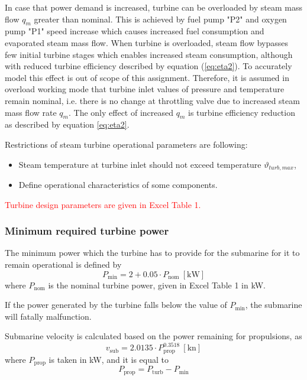\documentclass[openany]{book}
\begin{document}
	In case that power demand is increased, turbine can be overloaded by steam 
	mass flow $q_m$ greater than nominal. This is achieved by fuel pump "P2" 
	and oxygen pump "P1" speed increase which causes increased fuel consumption 
	and evaporated steam mass flow. When turbine is overloaded, steam flow 
	bypasses few initial turbine stages which enables increased steam 
	consumption, although with reduced turbine efficiency described by equation 
	(\ref{eq:eta2}). To accurately model this effect is out of scope of this assignment. 
	Therefore, it is assumed in overload working mode that turbine inlet values 
	of pressure and temperature remain nominal, i.e. there is no change at 
	throttling valve due to increased steam mass flow rate $q_m$. The only 
	effect of increased $q_m$ is turbine efficiency reduction as described by 
	equation \ref{eq:eta2}.
	
	Restrictions of steam turbine operational parameters are following:
	
	\begin{itemize}
		\item Steam temperature at turbine inlet should not exceed temperature 
		$\vartheta_{turb,max}$,
		\item Define operational characteristics of some components.
	\end{itemize}
	
	\noindent
	\textcolor{red}{Turbine design parameters are given in Excel Table 1.}
	
	\subsubsection*{Minimum required turbine power}
	
	The minimum power which the turbine has to provide for the submarine for it 
	to remain operational is defined by
	\begin{equation}\label{eq:minpower}
	P_\textrm{min} = 2 + 0.05 \cdot P_\textrm{nom} \ \left[\textrm{kW}\right]
	\end{equation}
	where $P_\textrm{nom}$ is the nominal turbine power, given in Excel Table 1 
	in kW.
	
	If the power generated by the turbine falls below the value of 
	$P_\textrm{min}$, the submarine will fatally malfunction.
	
	Submarine velocity is calculated based on the power remaining for 
	propulsions, as
	\begin{equation}
	v_\textrm{sub} = 2.0135 \cdot P_\textrm{prop}^{0.3518} \ 
	\left[\textrm{kn}\right]
	\end{equation}
	where $P_\textrm{prop}$ is taken in kW, and it is equal to
	\begin{equation}
	P_\textrm{prop} = P_\textrm{turb} - P_\textrm{min}
	\end{equation}
	
\end{document}

